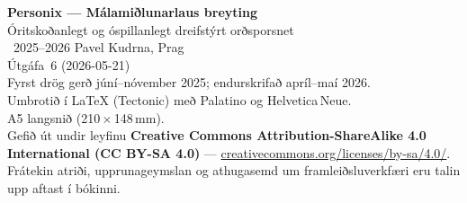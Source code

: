 \thispagestyle{empty}
\ifdefined\printmode\vspace*{\fill}\else{}\fi
\begin{flushleft}\small\sffamily
\textbf{Personix --- Málamiðlunarlaus breyting}\\[0.3em]
Óritskoðanlegt og óspillanlegt dreifstýrt orðsporsnet\\[1.4em]

\textcopyright\ 2025--2026 Pavel Kudrna, Prag\\[0.4em]

Útgáfa~6 (2026-05-21)\\
Fyrst drög gerð júní--nóvember 2025; endurskrifað apríl--maí 2026.\\[1.4em]

Umbrotið í \LaTeX{} (Tectonic) með Palatino og Helvetica\,Neue.\\
A5 langsnið (210\,$\times$\,148\,mm).\\[1.4em]

Gefið út undir leyfinu \textbf{Creative Commons Attribution-ShareAlike 4.0
International (CC BY-SA 4.0)} ---
\href{https://creativecommons.org/licenses/by-sa/4.0/}{creativecommons.org/licenses/by-sa/4.0/}.
Frátekin atriði, upprunageymslan og athugasemd um framleiðsluverkfæri
eru talin upp aftast í bókinni.
\end{flushleft}
\ifdefined\printmode\else{}\fi
\clearpage
